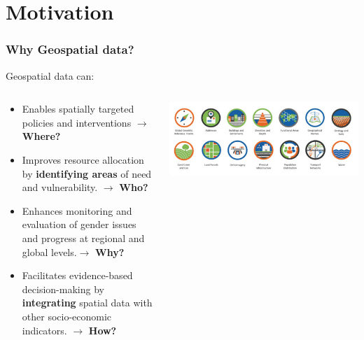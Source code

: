 \documentclass[xcolor=x11names,compress]{beamer}
\renewcommand{\(}{\begin{columns}}
\renewcommand{\)}{\end{columns}}
\newcommand{\<}[1]{\begin{column}{#1}}
\renewcommand{\>}{\end{column}}
\begin{document}
\section{Motivation}

\begin{frame}
    \frametitle{Why Geospatial data? }
    Geospatial data can:
    \begin{columns}[T]
        \begin{column}{0.7\textwidth}
            \begin{itemize}[<+->]
            \item Enables spatially targeted policies and interventions $\rightarrow$ \textbf{Where?}
            \item Improves resource allocation by \textbf{identifying areas} of need and vulnerability. $\rightarrow$ \textbf{Who?}
            \item Enhances monitoring and evaluation of gender issues and progress at regional and global levels.$\rightarrow$ \textbf{Why?}
            \item Facilitates evidence-based decision-making by \textbf{integrating} spatial data with other socio-economic indicators. $\rightarrow$ \textbf{How?}
            \end{itemize}
        \end{column}
        \begin{column}{0.3\textwidth}
            \includegraphics[width=\textwidth]{GeospatialInformation.PNG}
        \end{column}
    \end{columns}
\end{frame}
\end{document}
